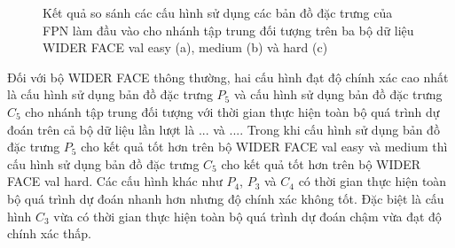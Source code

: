 {    \begin{figure}[H]
        \centering
        \caption{Kết quả so sánh các cấu hình sử dụng các bản đồ đặc trưng của FPN làm đầu vào cho nhánh tập trung đối tượng trên ba bộ dữ liệu WIDER FACE val easy (a), medium (b) và hard (c)}
        \label{fig:retinafocus_widerface_val_fpn}
    \end{figure}

    \noindent
    Đối với bộ WIDER FACE thông thường, hai cấu hình đạt độ chính xác cao nhất là cấu hình sử dụng bản đồ đặc trưng ${P}_{5}$ và cấu hình sử dụng bản đồ đặc trưng ${C}_{5}$ cho nhánh tập trung đối tượng với thời gian thực hiện toàn bộ quá trình dự đoán trên cả bộ dữ liệu lần lượt là ... và ....
    Trong khi cấu hình sử dụng bản đồ đặc trưng ${P}_{5}$ cho kết quả tốt hơn trên bộ WIDER FACE val easy và medium thì cấu hình sử dụng bản đồ đặc trưng ${C}_{5}$ cho kết quả tốt hơn trên bộ WIDER FACE val hard.
    Các cấu hình khác như ${P}_{4}$, ${P}_{3}$ và ${C}_{4}$ có thời gian thực hiện toàn bộ quá trình dự đoán nhanh hơn nhưng độ chính xác không tốt.
    Đặc biệt là cấu hình ${C}_{3}$ vừa có thời gian thực hiện toàn bộ quá trình dự đoán chậm vừa đạt độ chính xác thấp.

}
